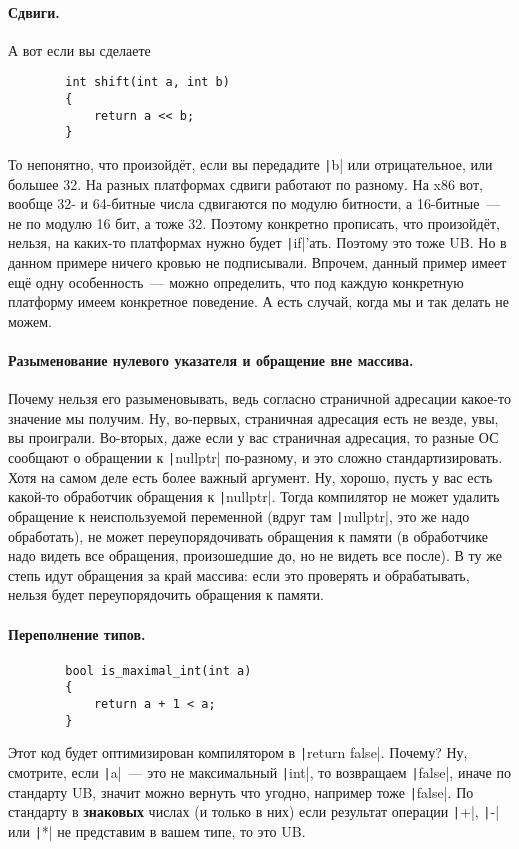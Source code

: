 \documentclass{article}
\begin{document}
    \paragraph{Сдвиги.}
    А вот если вы сделаете
    \begin{verbatim}
        int shift(int a, int b)
        {
            return a << b;
        }
    \end{verbatim}
    То непонятно, что произойдёт, если вы передадите \texttt|b| или отрицательное, или большее 32. На разных платформах сдвиги работают по разному. На x86 вот, вообще 32- и 64-битные числа сдвигаются по модулю битности, а 16-битные~--- не по модулю 16 бит, а тоже 32. Поэтому конкретно прописать, что произойдёт, нельзя, на каких-то платформах нужно будет \texttt|if|'ать. Поэтому это тоже UB. Но в данном примере ничего кровью не подписывали. Впрочем, данный пример имеет ещё одну особенность~--- можно определить, что под каждую конкретную платформу имеем конкретное поведение. А есть случай, когда мы и так делать не можем.
    \paragraph{Разыменование нулевого указателя и обращение вне массива.}
    Почему нельзя его разыменовывать, ведь согласно страничной адресации какое-то значение мы получим. Ну, во-первых, страничная адресация есть не везде, увы, вы проиграли. Во-вторых, даже если у вас страничная адресация, то разные ОС сообщают о обращении к \texttt|nullptr| по-разному, и это сложно стандартизировать. Хотя на самом деле есть более важный аргумент. Ну, хорошо, пусть у вас есть какой-то обработчик обращения к \texttt|nullptr|. Тогда компилятор не может удалить обращение к неиспользуемой переменной (вдруг там \texttt|nullptr|, это же надо обработать), не может переупорядочивать обращения к памяти (в обработчике надо видеть все обращения, произошедшие до, но не видеть все после). В ту же степь идут обращения за край массива: если это проверять и обрабатывать, нельзя будет переупорядочить обращения к памяти.
    \paragraph{Переполнение типов.}
    \begin{verbatim}
        bool is_maximal_int(int a)
        {
            return a + 1 < a;
        }
    \end{verbatim}
    Этот код будет оптимизирован компилятором в \texttt|return false|. Почему? Ну, смотрите, если \texttt|a|~--- это не максимальный \texttt|int|, то возвращаем \texttt|false|, иначе по стандарту UB, значит можно вернуть что угодно, например тоже \texttt|false|. По стандарту в \textbf{знаковых} числах (и только в них) если результат операции \texttt|+|, \texttt|-| или \texttt|*| не представим в вашем типе, то это UB.
\end{document}
